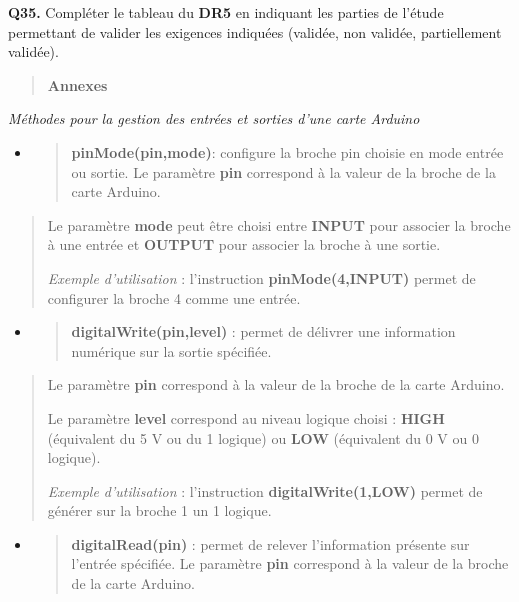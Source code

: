 \documentclass[]{article}
\begin{document}
\textbf{Q35.} Compléter le tableau du \textbf{DR5} en indiquant les
parties de l'étude permettant de valider les exigences indiquées
(validée, non validée, partiellement validée).

\begin{quote}
\textbf{Annexes}
\end{quote}

\emph{Méthodes pour la gestion des entrées et sorties d'une carte
Arduino}

\begin{itemize}
\item
  \begin{quote}
  \textbf{pinMode(pin,mode)}: configure la broche pin choisie en mode
  entrée ou sortie. Le paramètre \textbf{pin} correspond à la valeur de
  la broche de la carte Arduino.
  \end{quote}
\end{itemize}

\begin{quote}
Le paramètre \textbf{mode} peut être choisi entre \textbf{INPUT} pour
associer la broche à une entrée et \textbf{OUTPUT} pour associer la
broche à une sortie.

\emph{Exemple d'utilisation} : l'instruction \textbf{pinMode(4,INPUT)}
permet de configurer la broche 4 comme une entrée.
\end{quote}

\begin{itemize}
\item
  \begin{quote}
  \textbf{digitalWrite(pin,level)} : permet de délivrer une information
  numérique sur la sortie spécifiée.
  \end{quote}
\end{itemize}

\begin{quote}
Le paramètre \textbf{pin} correspond à la valeur de la broche de la
carte Arduino.

Le paramètre \textbf{level} correspond au niveau logique choisi :
\textbf{HIGH} (équivalent du 5 V ou du 1 logique) ou \textbf{LOW}
(équivalent du 0 V ou 0 logique).

\emph{Exemple d'utilisation} : l'instruction
\textbf{digitalWrite(1,LOW)} permet de générer sur la broche 1 un 1
logique.
\end{quote}

\begin{itemize}
\item
  \begin{quote}
  \textbf{digitalRead(pin)} : permet de relever l'information présente
  sur l'entrée spécifiée. Le paramètre \textbf{pin} correspond à la
  valeur de la broche de la carte Arduino.
  \end{quote}
\end{itemize}
\end{document}
